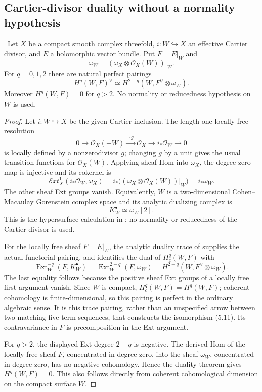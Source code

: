 \subsection{Cartier-divisor duality without a normality hypothesis}

\begin{theorem}
\label{thm:cartier-duality}
\Verified\ Let $X$ be a compact smooth complex threefold,
$i:W\hookrightarrow X$ an effective Cartier divisor, and $E$ a holomorphic
vector bundle.  Put $F=E|_W$ and
\[
\omega_W=(\omega_X\otimes\mathcal O_X(W))|_W.
\]
For $q=0,1,2$ there are natural perfect pairings
\[
H^q(W,F)^\vee
\simeq H^{2-q}(W,F^\vee\otimes\omega_W).
\tag{5.11}
\]
Moreover $H^q(W,F)=0$ for $q>2$.  No normality or reducedness hypothesis on
$W$ is used.
\end{theorem}

\begin{proof}
Let \(i:W\hookrightarrow X\) be the given Cartier inclusion.  The
length-one locally free resolution
\[
 0\longrightarrow\mathcal O_X(-W)
 \xrightarrow{\;\cdot g\;}\mathcal O_X
 \longrightarrow i_*\mathcal O_W\longrightarrow0
\]
is locally defined by a nonzerodivisor \(g\); changing \(g\) by a unit
gives the usual transition functions for \(\mathcal O_X(W)\).
Applying sheaf Hom into \(\omega_X\), the degree-zero map is
injective and its cokernel is
\[
 \mathcal E xt^1_X(i_*\mathcal O_W,\omega_X)
 =i_*\bigl((\omega_X\otimes\mathcal O_X(W))|_W\bigr)
 =i_*\omega_W.
\]
The other sheaf Ext groups vanish.  Equivalently, \(W\) is a
two-dimensional Cohen--Macaulay Gorenstein complex space and its
analytic dualizing complex is
\[
 K_W^\bullet\simeq\omega_W[2].
\]
This is the hypersurface calculation in
\cite[Proposition~2 and pp.~90--91]{RamisRuget1970}; no normality or
reducedness of the Cartier divisor is used.

For the locally free sheaf \(F=E|_W\), the analytic duality trace of
\cite[Theorem~2, pp.~82--83]{RamisRuget1970} supplies the actual
functorial pairing, and identifies the dual of \(H_c^q(W,F)\) with
\[
 \operatorname{Ext}^{-q}_W(F,K_W^\bullet)
 =\operatorname{Ext}^{2-q}_W(F,\omega_W)
 =H^{2-q}(W,F^\vee\otimes\omega_W).
\]
The last equality follows because the positive sheaf Ext groups
of a locally free first argument vanish.  Since \(W\) is compact,
\(H_c^q(W,F)=H^q(W,F)\); coherent cohomology is finite-dimensional,
so this pairing is perfect in the ordinary algebraic sense.
It is this trace pairing, rather than an unspecified arrow between
two matching five-term sequences, that constructs the isomorphism
(5.11).  Its contravariance in \(F\) is precomposition in the Ext
argument.

For \(q>2\), the displayed Ext degree \(2-q\) is negative.  The
derived Hom of the locally free sheaf \(F\), concentrated in degree
zero, into the sheaf \(\omega_W\), concentrated in degree zero, has
no negative cohomology.  Hence the duality theorem gives
\(H^q(W,F)=0\).  This also follows directly from coherent
cohomological dimension on the compact surface \(W\).
\end{proof}

